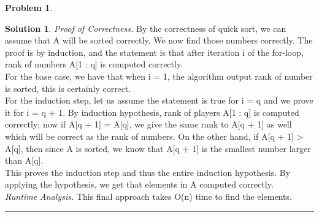 \documentclass{article}
\theoremstyle{definition}
\newtheorem{problem}{Problem}
\def\fline{\rule{0.75\linewidth}{0.5pt}}
\newcommand{\finishline}{\begin{center}\fline\end{center}}
\newtheorem*{solution*}{Solution}
\newenvironment{solution}{\begin{solution*}}{{\finishline} \end{solution*}}
\begin{document}
\begin{problem}
\begin{enumerate}
\begin{solution}
		\emph{Proof of Correctness.} By the correctness of quick sort, we can assume that A will be sorted correctly. We now find those numbers correctly. The proof is by induction, and the statement is that after iteration i of the for-loop, rank of numbers A[1 : q] is computed correctly. \\
For the base case, we have that when i = 1, the algorithm output rank of number is sorted, this is certainly correct. \\
For the induction step, let us assume the statement is true for i = q and we prove it for i = q + 1. By induction hypothesis, rank of players A[1 : q] is computed correctly; now if A[q + 1] = A[q], we give the same rank to A[q + 1] as well which will be correct as the rank of numbers. On the other hand, if A[q + 1] > A[q], then since A is sorted, we know that A[q + 1] is the smallest number larger than A[q]. \\
This proves the induction step and thus the entire induction hypothesis. By applying the hypothesis, we get that elements in A computed correctly. \\
 
		\emph{Runtime Analysis.} This final approach takes O(n) time to find the elements. \\
		
	\end{solution}

	\end{enumerate}
	
\end{problem}
\end{document}
